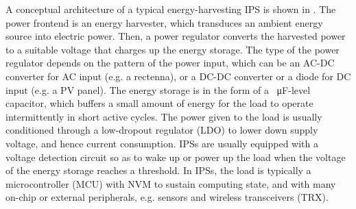 A conceptual architecture of a typical energy-harvesting IPS is shown in .
The power frontend is an energy harvester, which transduces an ambient energy source into electric power. 
Then, a power regulator converts the harvested power to a suitable voltage that charges up the energy storage.
The type of the power regulator depends on the pattern of the power input, which can be an AC-DC converter for AC input (e.g. a rectenna), or a DC-DC converter or a diode for DC input (e.g. a PV panel). 
The energy storage is in the form of a \SI{}{\micro\farad}-level capacitor, which buffers a small amount of energy for the load to operate intermittently in short active cycles.
The power given to the load is usually conditioned through a low-dropout regulator (LDO) to lower down supply voltage, and hence current consumption. 
IPSs are usually equipped with a voltage detection circuit so as to wake up or power up the load when the voltage of the energy storage reaches a threshold. 
In IPSs, the load is typically a microcontroller (MCU) with NVM to sustain computing state, and with many on-chip or external peripherals, e.g. sensors and wireless transceivers (TRX). 





